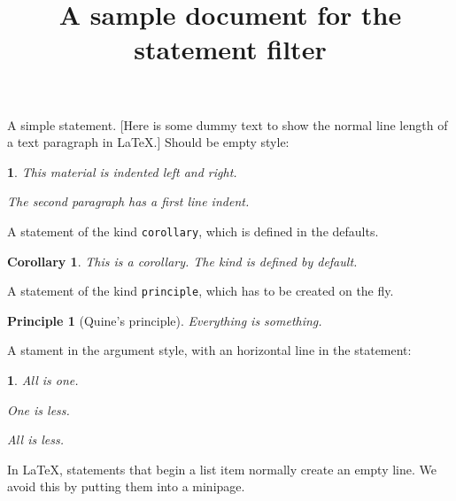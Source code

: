 \documentclass[
]{article}
\title{A sample document for the statement filter}
\author{}
\date{}
\theoremstyle{empty}
\newtheorem{statement}{}
\theoremstyle{plain}
\newtheorem{corollary}{Corollary}
\theoremstyle{plain}
\newtheorem{principle}{Principle}
\theoremstyle{emptynoindent}
\newtheorem{argument}{}
\begin{document}
\maketitle

A simple statement. {[}Here is some dummy text to show the normal line
length of a text paragraph in LaTeX.{]} Should be empty style:

\begin{statement}

This material is indented left and right.

The second paragraph has a first line indent.

\end{statement}

A statement of the kind \texttt{corollary}, which is defined in the
defaults.

\begin{corollary}

This is a corollary. The kind is defined by default.

\end{corollary}

A statement of the kind \texttt{principle}, which has to be created on
the fly.

\begin{principle}[Quine’s principle]

Everything is something.

\end{principle}

A stament in the argument style, with an horizontal line in the
statement:

\begin{argument}

All is one.

One is less.

\nopagebreak\raisebox{.25\baselineskip}{\rule{0.5\linewidth}{0.5pt}}

All is less.

\end{argument}

In LaTeX, statements that begin a list item normally create an empty
line. We avoid this by putting them into a minipage.

\edef\docparindent{\the\parindent}
\end{document}
